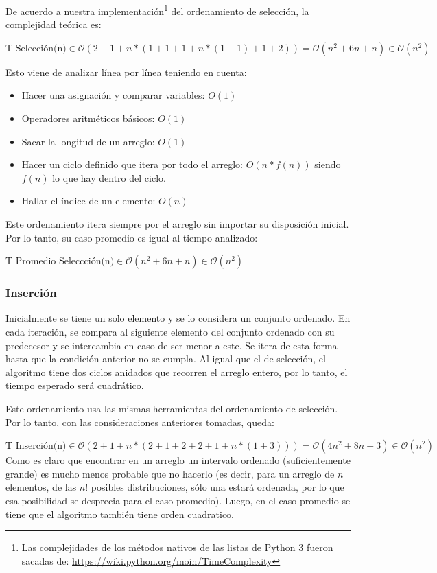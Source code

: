 \documentclass[article,a4paper]{article}
\newcommand{\bigO}{\mathcal{O}}
\begin{document}
De acuerdo a nuestra implementación\footnote{Las complejidades de los métodos nativos de las listas de Python 3 fueron sacadas de: \url{https://wiki.python.org/moin/TimeComplexity}} del ordenamiento de selección, la complejidad teórica es:

$\mbox{T Selección(n)} \in \bigO(2 + 1 + n * (1 + 1 + 1 + n * (1 + 1) + 1 + 2)) = \bigO(n^2 + 6n + n) \in \bigO(n^2)$

Esto viene de analizar línea por línea teniendo en cuenta:
\begin{itemize}
\item Hacer una asignación y comparar variables: $O(1)$
\item Operadores aritméticos básicos: $O(1)$
\item Sacar la longitud de un arreglo: $O(1)$
\item Hacer un ciclo definido que itera por todo el arreglo: $O(n * f(n))$ siendo $f(n)$ lo que hay dentro del ciclo.
\item Hallar el índice de un elemento: $O(n)$
\end{itemize}

Este ordenamiento itera siempre por el arreglo sin importar su disposición inicial. Por lo tanto, su caso promedio es igual al tiempo analizado:

$\mbox{T Promedio Seleccción(n)} \in \bigO(n^2 + 6n + n) \in \bigO(n^2)$


\subsubsection{Inserción}

Inicialmente se tiene un solo elemento y se lo considera un conjunto ordenado. En cada iteración, se compara al siguiente elemento del conjunto ordenado con su predecesor y se intercambia en caso de ser menor a este. Se itera de esta forma hasta que la condición anterior no se cumpla. Al igual que el de selección, el algoritmo tiene dos ciclos anidados que recorren el arreglo entero, por lo tanto, el tiempo esperado será cuadrático.

Este ordenamiento usa las mismas herramientas del ordenamiento de selección. Por lo tanto, con las consideraciones anteriores tomadas, queda:

$\mbox{T Inserción(n)} \in \bigO( 2 + 1 + n * (2 + 1 + 2 + 2 + 1 + n * (1 + 3))) = \bigO(4n^2 + 8n + 3) \in \bigO(n^2)$\\

Como es claro que encontrar en un arreglo un intervalo ordenado (suficientemente grande) es mucho menos probable que no hacerlo (es decir, para un arreglo de $n$ elementos, de las $n!$ posibles distribuciones, sólo una estará  ordenada,  por lo que esa posibilidad se desprecia para el caso promedio). Luego, en el caso promedio se tiene que el algoritmo también tiene orden cuadratico.
\end{document}
